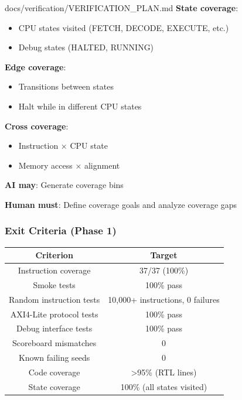 \begin{relocated}{docs/verification/VERIFICATION_PLAN.md}
\textbf{State coverage}:

\begin{itemize}
\tightlist
\item
  CPU states visited (FETCH, DECODE, EXECUTE, etc.)
\item
  Debug states (HALTED, RUNNING)
\end{itemize}

\textbf{Edge coverage}:

\begin{itemize}
\tightlist
\item
  Transitions between states
\item
  Halt while in different CPU states
\end{itemize}

\textbf{Cross coverage}:

\begin{itemize}
\tightlist
\item
  Instruction × CPU state
\item
  Memory access × alignment
\end{itemize}

\textbf{AI may}: Generate coverage bins

\textbf{Human must}: Define coverage goals and analyze coverage gaps

\subsubsection{Exit Criteria (Phase 1)}\label{ds:ch:verification-plan:exit-criteria-phase-1}

{
\begin{longtable}[]{@{}cc@{}}
\toprule\noalign{}
Criterion & Target \\
\midrule\noalign{}
\endhead
\bottomrule\noalign{}
\endlastfoot
Instruction coverage & 37/37 (100\%) \\
Smoke tests & 100\% pass \\
Random instruction tests & 10,000+ instructions, 0 failures \\
AXI4-Lite protocol tests & 100\% pass \\
Debug interface tests & 100\% pass \\
Scoreboard mismatches & 0 \\
Known failing seeds & 0 \\
Code coverage & \textgreater95\% (RTL lines) \\
State coverage & 100\% (all states visited) \\
\end{longtable}
}


\end{relocated}
